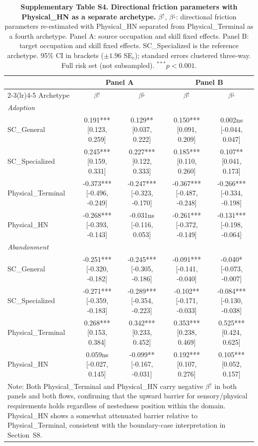 \begin{table}[ht]
\centering\small
\caption{\textbf{Supplementary Table S4. Directional friction parameters
  with Physical\_HN as a separate archetype.}
  $\beta^{\uparrow}$, $\beta^{\downarrow}$: directional friction parameters
  re-estimated with Physical\_HN separated from Physical\_Terminal as a fourth archetype.
  Panel A: source occupation and skill fixed effects.
  Panel B: target occupation and skill fixed effects.
  SC\_Specialized is the reference archetype.
  95\% CI in brackets ($\pm 1.96$ SE$_c$); standard errors clustered three-way.
  Full risk set (not subsampled). $^{***}p<0.001$.}
\label{tab:SI_S4}
\begin{tabular}{lcccc}
\toprule
 & \multicolumn{2}{c}{Panel A} & \multicolumn{2}{c}{Panel B} \\
\cmidrule(lr){2-3}\cmidrule(lr){4-5}
Archetype & $\beta^{\uparrow}$ & $\beta^{\downarrow}$ & $\beta^{\uparrow}$ & $\beta^{\downarrow}$ \\
\midrule
\multicolumn{5}{l}{\textit{Adoption}} \\
SC_General & 0.191*** [0.123, 0.259] & 0.129** [0.037, 0.222] & 0.150*** [0.091, 0.209] & 0.002ns [-0.044, 0.047] \\
SC_Specialized & 0.245*** [0.159, 0.331] & 0.227*** [0.122, 0.333] & 0.185*** [0.110, 0.260] & 0.107** [0.041, 0.173] \\
Physical_Terminal & -0.373*** [-0.496, -0.249] & -0.247*** [-0.323, -0.170] & -0.367*** [-0.487, -0.248] & -0.266*** [-0.334, -0.198] \\
Physical_HN & -0.268*** [-0.393, -0.143] & -0.031ns [-0.116, 0.053] & -0.261*** [-0.372, -0.149] & -0.131*** [-0.198, -0.064] \\
\midrule
\multicolumn{5}{l}{\textit{Abandonment}} \\
SC_General & -0.251*** [-0.320, -0.182] & -0.245*** [-0.305, -0.186] & -0.091*** [-0.141, -0.040] & -0.040* [-0.073, -0.007] \\
SC_Specialized & -0.271*** [-0.359, -0.183] & -0.289*** [-0.354, -0.223] & -0.102** [-0.171, -0.033] & -0.084*** [-0.130, -0.038] \\
Physical_Terminal & 0.268*** [0.153, 0.384] & 0.342*** [0.233, 0.452] & 0.353*** [0.238, 0.469] & 0.525*** [0.424, 0.625] \\
Physical_HN & 0.059ns [-0.027, 0.145] & -0.099** [-0.167, -0.031] & 0.192*** [0.107, 0.276] & 0.105*** [0.052, 0.157] \\
\bottomrule
\multicolumn{5}{p{14cm}}{\footnotesize Note:
  Both Physical\_Terminal and Physical\_HN carry negative $\beta^{\uparrow}$
  in both panels and both flows, confirming that the upward barrier for
  sensory/physical requirements holds regardless of nestedness position
  within the domain. Physical\_HN shows a somewhat attenuated barrier
  relative to Physical\_Terminal, consistent with the boundary-case
  interpretation in Section~S8.}
\end{tabular}
\end{table}
